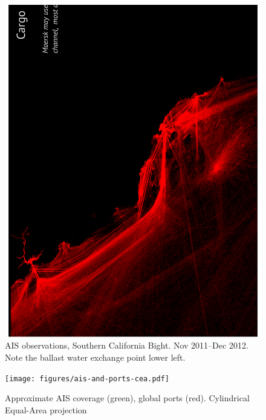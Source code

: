 \begin{figure}[htbp]
  \centering
  \includegraphics[width=140mm,angle=-90]{figures/cal-cargo.pdf}
  \caption{AIS observations, Southern California Bight. Nov 2011--Dec 2012. Note the ballast water exchange point lower left.}
  \label{fig:cal-cargo}
\end{figure}


\begin{figure}[htbp]
  \centering
  \texttt{[image: figures/ais-and-ports-cea.pdf]}
  \caption{Approximate AIS coverage (green), global ports (red). Cylindrical Equal-Area projection}
  \label{fig:ais-coverage}
\end{figure}


